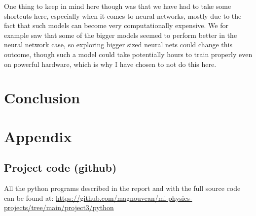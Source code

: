 \documentclass{article}
\begin{document}
One thing to keep in mind here though was that we have had to take some
shortcuts here, especially when it comes to neural networks, mostly due to the
fact that such models can become very computationally expensive. We for example
saw that some of the bigger models seemed to perform better in the neural
network case, so exploring bigger sized neural nets could change this outcome,
though such a model could take potentially hours to train properly even on
powerful hardware, which is why I have chosen to not do this here.

\section{Conclusion}

\section{Appendix}

\subsection{Project code (github)}
All the python programs described in the report and with the full source code can be
found at:
\url{https://github.com/magnouvean/ml-physics-projects/tree/main/project3/python}


\end{document}
